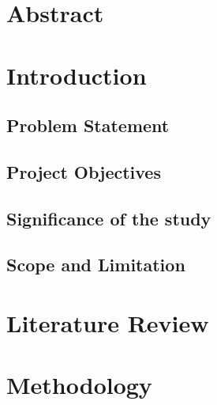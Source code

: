 \documentclass[a4paper,12pt]{article}
\begin{document}
\newpage
{}
\section*{Abstract}


\newpage
\tableofcontents

\newpage
\listoffigures

\newpage
\listoftables

\newpage
{}

\section{Introduction}


\subsection{Problem Statement}


\newpage

\subsection{Project Objectives}


\newpage

\subsection{Significance of the study}


\newpage

\subsection{Scope and Limitation}

\newpage

\section{Literature Review}

\newpage

\section{Methodology}

\newpage
\newpage
\end{document}
